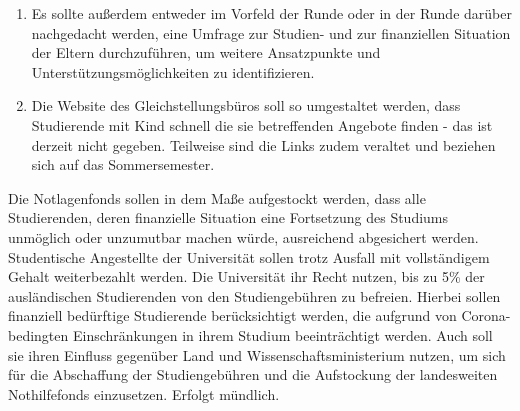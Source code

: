 {\begin{enumerate}
{            Studierende
            mit Kind, die in Wohnheimen wohnen, möglich ist.}
            \item {Es sollte außerdem entweder im Vorfeld der Runde oder in der Runde darüber
            nachgedacht
            werden, eine Umfrage zur Studien- und zur finanziellen Situation der Eltern
            durchzuführen,
            um weitere Ansatzpunkte und Unterstützungsmöglichkeiten zu identifizieren.}
            \item {Die Website des Gleichstellungsbüros soll so umgestaltet werden, dass Studierende
            mit
            Kind schnell die sie betreffenden Angebote finden - das ist derzeit nicht gegeben.
            Teilweise
            sind die Links zudem veraltet und beziehen sich auf das Sommersemester.}
        \end{enumerate}
    }{
    }{
    }{
    }
    {
        Die Notlagenfonds sollen in dem Maße aufgestockt werden, dass alle Studierenden,
        deren
        finanzielle Situation eine Fortsetzung des Studiums unmöglich oder unzumutbar machen
        würde,
        ausreichend abgesichert werden. Studentische Angestellte der Universität sollen trotz
        Ausfall mit
        vollständigem Gehalt weiterbezahlt werden.
        Die Universität ihr Recht nutzen, bis zu 5\% der ausländischen Studierenden von den
        Studiengebühren zu befreien. Hierbei sollen finanziell bedürftige Studierende
        berücksichtigt
        werden, die aufgrund von Corona-bedingten Einschränkungen in ihrem Studium
        beeinträchtigt
        werden. Auch soll sie ihren Einfluss gegenüber Land und Wissenschaftsministerium
        nutzen, um
        sich für die Abschaffung der Studiengebühren und die Aufstockung der landesweiten
        Nothilfefonds
        einzusetzen.
    }{
        Erfolgt mündlich.
    }{
    }{
    }
